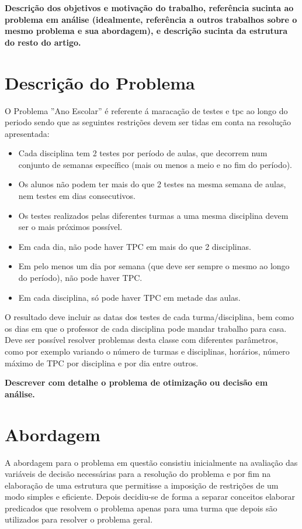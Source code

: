 \documentclass{llncs}
\begin{document}
\textbf{
Descrição dos objetivos e motivação do trabalho, referência
sucinta ao problema em análise (idealmente, referência a outros trabalhos sobre o mesmo
problema e sua abordagem), e descrição sucinta da estrutura do resto do artigo.}

\newpage
\section{Descrição do Problema}
%

O Problema ''Ano Escolar'' é referente á maracação de testes e tpc ao longo do periodo sendo que as seguintes restrições devem ser tidas em conta na resolução apresentada:

	\begin{itemize}
	\item Cada disciplina tem 2 testes por período de aulas, que decorrem num conjunto de semanas específico (mais ou menos a meio e no fim do período). 	
	\item Os alunos não podem ter mais do que 2 testes na mesma semana de aulas, nem testes em dias consecutivos.
	\item Os testes realizados pelas diferentes turmas a uma
		    mesma disciplina devem ser o mais próximos possível.
	\item Em cada dia, não pode haver TPC em mais do que 2 disciplinas.
	\item Em pelo menos um dia por semana (que deve ser sempre o mesmo ao longo do
	  período), não pode haver TPC. 
	\item Em cada disciplina, só pode haver TPC em metade das aulas.
	\end{itemize}
O resultado deve incluir as datas dos testes de cada turma/disciplina, bem como os dias em que o professor de cada
disciplina pode mandar trabalho para casa.
Deve ser possível resolver problemas desta classe com diferentes parâmetros, como por exemplo variando o número de turmas e disciplinas, horários, número máximo de TPC por disciplina e por dia entre outros.


\textbf{
Descrever com detalhe o problema de otimização ou decisão em análise.}

\section{Abordagem}
%
A abordagem para o problema em questão consistiu inicialmente na avaliação das variáveis de decisão necessárias para a resolução do problema e por fim na elaboração de uma estrutura que permitisse a imposição de restrições de um modo simples e eficiente.
Depois decidiu-se de forma a separar conceitos elaborar predicados que resolvem o problema apenas para uma turma que depois são utilizados para resolver o problema geral.
\end{document}
